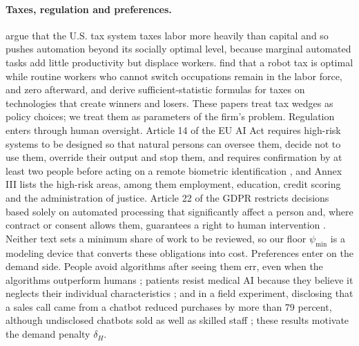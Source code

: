 \paragraph{Taxes, regulation and preferences.} \citet{acemoglu2020does} argue that the U.S. tax system taxes labor more heavily than capital and so pushes automation beyond its socially optimal level, because marginal automated tasks add little productivity but displace workers. \citet{guerreiro2022should} find that a robot tax is optimal while routine workers who cannot switch occupations remain in the labor force, and zero afterward, and \citet{costinot2023robots} derive sufficient-statistic formulas for taxes on technologies that create winners and losers. These papers treat tax wedges as policy choices; we treat them as parameters of the firm's problem. Regulation enters through human oversight. Article 14 of the EU AI Act requires high-risk systems to be designed so that natural persons can oversee them, decide not to use them, override their output and stop them, and requires confirmation by at least two people before acting on a remote biometric identification \citep{eu2024regulation}, and Annex III lists the high-risk areas, among them employment, education, credit scoring and the administration of justice. Article 22 of the GDPR restricts decisions based solely on automated processing that significantly affect a person and, where contract or consent allows them, guarantees a right to human intervention \citep{eu2016regulation}. Neither text sets a minimum share of work to be reviewed, so our floor $\psi_{\min}$ is a modeling device that converts these obligations into cost. Preferences enter on the demand side. People avoid algorithms after seeing them err, even when the algorithms outperform humans \citep{dietvorst2015algorithm}; patients resist medical AI because they believe it neglects their individual characteristics \citep{longoni2019resistance}; and in a field experiment, disclosing that a sales call came from a chatbot reduced purchases by more than 79 percent, although undisclosed chatbots sold as well as skilled staff \citep{luo2019machines}; these results motivate the demand penalty $\delta_H$.

